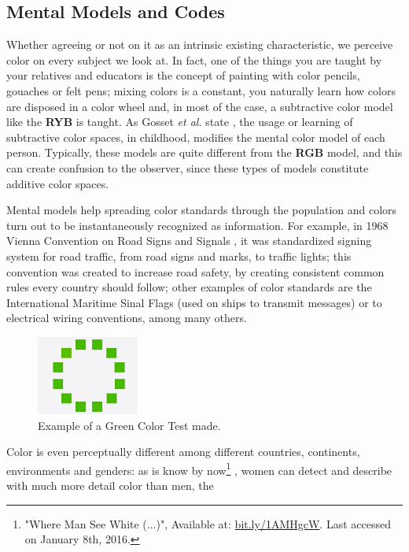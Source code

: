 \documentclass{report}
\begin{document}
\subsection{Mental Models and Codes}
Whether agreeing or not on it as an intrinsic existing characteristic, we perceive color on every
subject we look at. In fact, one of the things you are taught by your relatives and educators is the concept of
painting with color pencils, gouaches or felt pens; mixing colors is a constant,
you naturally learn how colors are disposed in a color wheel and, in most of the case, a subtractive color
model like the \textbf{RYB} is taught. As Gosset \emph{et al.} state \cite{Gossett2004}, the usage or learning of
subtractive color spaces, in childhood, modifies the mental color model of each person. Typically, these models are quite
different from the \textbf{RGB} model, and this can create confusion to
the observer, since these types of models constitute additive color spaces. \par
Mental models help spreading color standards through the population and colors turn out to be instantaneously
recognized as information. For example, in 1968 Vienna Convention on Road Signs and Signals \cite{Nations1995}, it was standardized signing system for road traffic, from road signs and marks, to traffic lights;
this convention was created to increase road safety, by creating consistent common rules every country
should follow; other examples of color standards are the International Maritime Sinal Flags
\cite{Agency2003} (used on ships to transmit messages) or to electrical wiring conventions, among many others. \par
%
\begin{figure}
	\centering
    \vspace{-\baselineskip}
    \includegraphics[width=0.3\textwidth]{Himba_green-color-ring.jpg}
    \caption[Himba Test: Green Color Ring]{Example of a Green Color Test made.\protect\footnotemark[10]}
    \label{fig:himba}
\end{figure}
%
Color is even perceptually different among different countries, continents, environments and genders:
as is know by now\footnote{"Where Man See White (...)", Available at:
\url {bit.ly/1AMHgcW}.
Last accessed on January 8th, 2016.} \cite{Ginter2011}, women can detect and describe with much more detail color than men, the
\end{document}
